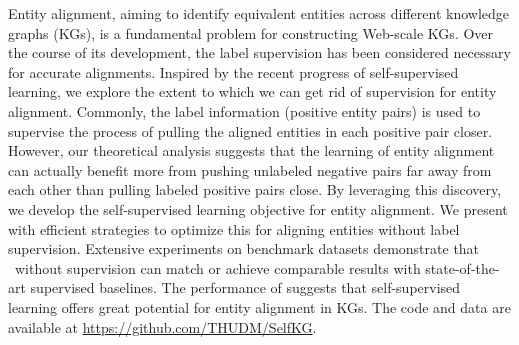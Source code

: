 Entity alignment, aiming to identify equivalent entities across different knowledge graphs (KGs), is a fundamental problem for constructing Web-scale KGs. 
Over the course of its development, the label supervision has been considered necessary for accurate alignments. 
Inspired by the recent progress of self-supervised learning, we explore the extent to which we can get rid of supervision for entity alignment. 
Commonly, the label information (positive entity pairs) is used to supervise the process of pulling the aligned entities in each positive pair closer.
However, our theoretical analysis suggests that the learning of entity alignment can actually benefit more from 
pushing unlabeled negative pairs far away from each other than pulling labeled positive pairs close. 
By leveraging this discovery, we develop the self-supervised learning objective for entity alignment.
We present \solution with efficient strategies to optimize this  for aligning entities without label supervision. 
Extensive experiments on benchmark datasets demonstrate that \solution~without supervision can 
match or achieve comparable results with state-of-the-art supervised baselines. 
The performance of \solution suggests that self-supervised learning offers great potential for entity alignment in KGs. 
{The code and data are available at \url{https://github.com/THUDM/SelfKG}}.